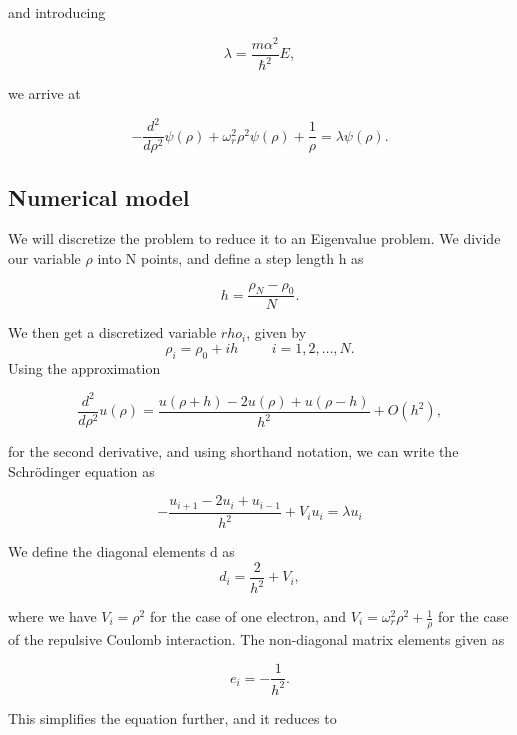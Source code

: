 \documentclass{emulateapj}
\begin{document}
and introducing

\begin{equation}
\lambda = \frac{m\alpha^2}{\hbar^2}E,
\end{equation}

we arrive at

\begin{equation}
  -\frac{d^2}{d\rho^2} \psi(\rho) + \omega_r^2\rho^2\psi(\rho) +\frac{1}{\rho} = \lambda \psi(\rho).
\end{equation}

\subsection{Numerical model}
We will discretize the problem to reduce it to an Eigenvalue problem. We divide our variable $\rho$ into N points, and define a step length h as

\begin{equation}
  h=\frac{\rho_N-\rho_0 }{N}.
\end{equation}

We then get a discretized variable $rho_i$, given by
\[
    \rho_i= \rho_0 + ih \hspace{1cm} i=1,2,\dots , N.
\]
Using the approximation

\begin{equation}
    \frac{d^2}{d\rho^2} u(\rho) =\frac{u(\rho+h) -2u(\rho) +u(\rho-h)}{h^2} +O(h^2),
    \label{eq:diffoperation}
\end{equation}

for the second derivative, and using shorthand notation, we can write the Schrödinger equation as

\begin{equation}
-\frac{u_{i+1} -2u_i +u_{i-1} }{h^2}+V_iu_i  = \lambda u_i
\end{equation}

We define the diagonal elements d as
\begin{equation}
   d_i=\frac{2}{h^2}+V_i,
\end{equation}

where we have $V_i = \rho^2$ for the case of one electron, and $V_i = \omega_r^2 \rho^2 + \frac{1}{\rho}$ for the case of the repulsive Coulomb interaction. The non-diagonal matrix elements given as

\begin{equation}
   e_i=-\frac{1}{h^2}.
\end{equation}

This simplifies the equation further, and it reduces to
\end{document}
